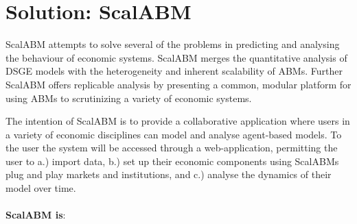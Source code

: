 \documentclass[a4paper]{article}
\begin{document}
\section{Solution: ScalABM}

ScalABM attempts to solve several of the problems in predicting and analysing the behaviour of economic systems. ScalABM merges the quantitative analysis of DSGE models with the heterogeneity and inherent scalability of ABMs. Further ScalABM offers replicable analysis by presenting a common, modular platform for using ABMs to scrutinizing a variety of economic systems. 

The intention of ScalABM is to provide a collaborative application where users in a variety of economic disciplines can model and analyse agent-based models. To the user the system will be accessed through a web-application, permitting the user to a.) import data, b.) set up their economic components using ScalABMs plug and play markets and institutions, and c.) analyse the dynamics of their model over time.
\\
\\
\textbf{ScalABM is}:
\end{document}
